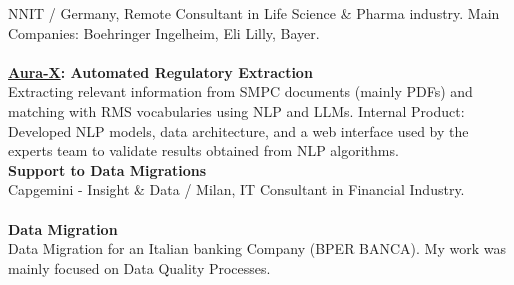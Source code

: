 \documentclass{my_cv}
\begin{document}
\begin{multicols}{2}
%
    {NNIT / Germany, Remote}%
    {Consultant in Life Science \& Pharma industry. Main Companies: Boehringer Ingelheim, Eli Lilly, Bayer.\\ \\
    \textbf{\href{https://www.nnit.com/our-solutions/regulatory-affairs/aura-x/}{Aura-X}: Automated Regulatory Extraction}\\
    Extracting relevant information from SMPC documents (mainly PDFs) and matching with RMS vocabularies using NLP and LLMs.
    Internal Product: Developed NLP models, data architecture, and a web interface used by the experts team to validate results obtained from NLP algorithms.\\
    \textbf{Support to Data Migrations}\\}%
{}%
%
    {Capgemini - Insight \& Data / Milan, IT}%
    {Consultant in Financial Industry.\\ \\
    \textbf{Data Migration}\\
    Data Migration for an Italian banking Company (BPER BANCA). My work was mainly focused on Data Quality Processes.\\}%
{}%


\end{multicols}
\end{document}
